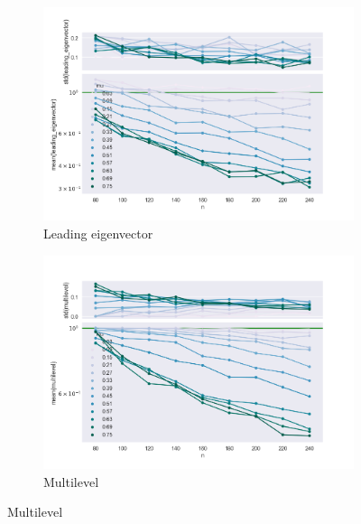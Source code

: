 \begin{figure}
    \begin{subfigure}[b]{0.32\textwidth}
        \includegraphics[width=\textwidth]{fig/ratio_vs_n_leading_eigenvector}
        \caption{Leading eigenvector}
        \label{fig:tiger}
    \end{subfigure}
    \qquad
    \begin{subfigure}[b]{0.32\textwidth}
        \includegraphics[width=\textwidth]{fig/ratio_vs_n_multilevel}
        \caption{Multilevel}
        \label{fig:mouse}
    \end{subfigure}


\end{figure}

